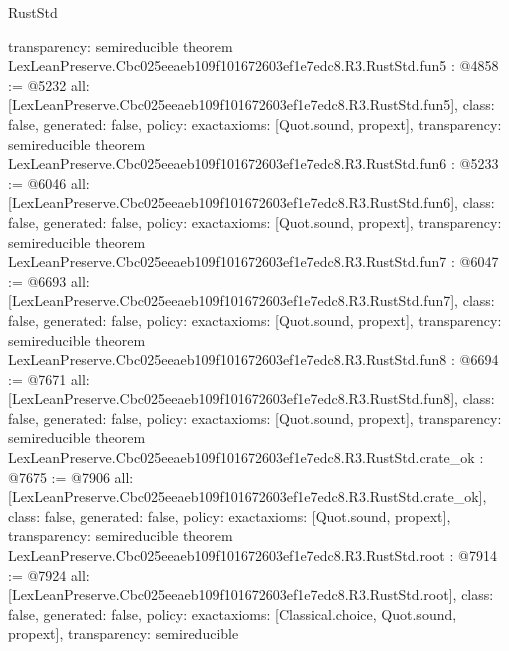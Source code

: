 \begin{lexlean}{RustStd}
\begin{coremodule}
{  transparency: semireducible
}
theorem LexLeanPreserve.Cbc025eeaeb109f101672603ef1e7edc8.R3.RustStd.fun5 : @4858 := @5232 {
  all: [LexLeanPreserve.Cbc025eeaeb109f101672603ef1e7edc8.R3.RustStd.fun5],
  class: false,
  generated: false,
  policy: exact{axioms: [Quot.sound, propext]},
  transparency: semireducible
}
theorem LexLeanPreserve.Cbc025eeaeb109f101672603ef1e7edc8.R3.RustStd.fun6 : @5233 := @6046 {
  all: [LexLeanPreserve.Cbc025eeaeb109f101672603ef1e7edc8.R3.RustStd.fun6],
  class: false,
  generated: false,
  policy: exact{axioms: [Quot.sound, propext]},
  transparency: semireducible
}
theorem LexLeanPreserve.Cbc025eeaeb109f101672603ef1e7edc8.R3.RustStd.fun7 : @6047 := @6693 {
  all: [LexLeanPreserve.Cbc025eeaeb109f101672603ef1e7edc8.R3.RustStd.fun7],
  class: false,
  generated: false,
  policy: exact{axioms: [Quot.sound, propext]},
  transparency: semireducible
}
theorem LexLeanPreserve.Cbc025eeaeb109f101672603ef1e7edc8.R3.RustStd.fun8 : @6694 := @7671 {
  all: [LexLeanPreserve.Cbc025eeaeb109f101672603ef1e7edc8.R3.RustStd.fun8],
  class: false,
  generated: false,
  policy: exact{axioms: [Quot.sound, propext]},
  transparency: semireducible
}
theorem LexLeanPreserve.Cbc025eeaeb109f101672603ef1e7edc8.R3.RustStd.crate_ok : @7675 := @7906 {
  all: [LexLeanPreserve.Cbc025eeaeb109f101672603ef1e7edc8.R3.RustStd.crate_ok],
  class: false,
  generated: false,
  policy: exact{axioms: [Quot.sound, propext]},
  transparency: semireducible
}
theorem LexLeanPreserve.Cbc025eeaeb109f101672603ef1e7edc8.R3.RustStd.root : @7914 := @7924 {
  all: [LexLeanPreserve.Cbc025eeaeb109f101672603ef1e7edc8.R3.RustStd.root],
  class: false,
  generated: false,
  policy: exact{axioms: [Classical.choice, Quot.sound, propext]},
  transparency: semireducible
}


\end{coremodule}
\end{lexlean}
